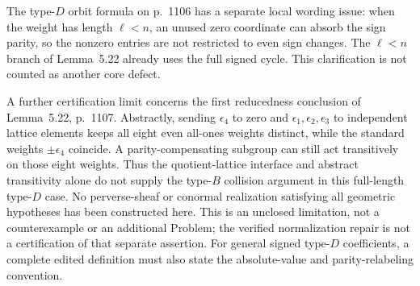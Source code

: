 \documentclass[10pt]{article}
\begin{document}
The type-\(D\) orbit formula on p. 1106 has a separate local wording issue: when the weight has length \(\ell<n\), an unused zero coordinate can absorb the sign parity, so the nonzero entries are not restricted to even sign changes. The \(\ell<n\) branch of Lemma 5.22 already uses the full signed cycle. This clarification is not counted as another core defect.\par
A further certification limit concerns the first reducedness conclusion of Lemma 5.22, p. 1107. Abstractly, sending \(\epsilon_4\) to zero and \(\epsilon_1,\epsilon_2,\epsilon_3\) to independent lattice elements keeps all eight even all-ones weights distinct, while the standard weights \(\pm\epsilon_4\) coincide. A parity-compensating subgroup can still act transitively on those eight weights. Thus the quotient-lattice interface and abstract transitivity alone do not supply the type-\(B\) collision argument in this full-length type-\(D\) case. No perverse-sheaf or conormal realization satisfying all geometric hypotheses has been constructed here. This is an unclosed limitation, not a counterexample or an additional Problem; the verified normalization repair is not a certification of that separate assertion. For general signed type-\(D\) coefficients, a complete edited definition must also state the absolute-value and parity-relabeling convention.\par
\end{document}
